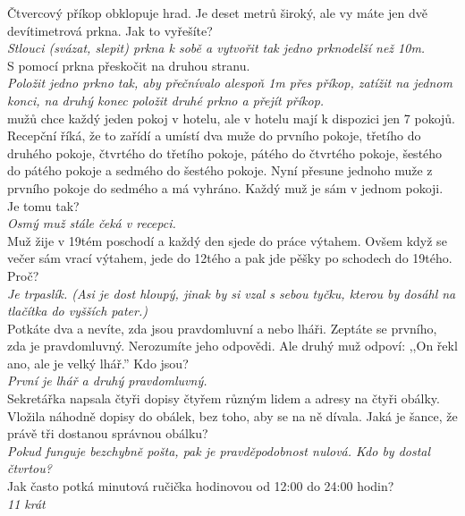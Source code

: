 \begin{multicols}{2}
\noindent
Čtvercový příkop obklopuje hrad. Je deset metrů široký, ale 
vy máte jen dvě devítimetrová prkna. Jak to vyřešíte?\\[1 mm]
{\sl Stlouci (svázat, slepit) prkna k sobě a vytvořit tak jedno
prknodelší než 10m.}\\

\noindent
S pomocí prkna přeskočit na druhou stranu.\\[1 mm]
{\sl Položit jedno prkno tak, aby přečnívalo alespoň 1m přes
příkop, zatížit na jednom konci, na druhý konec položit druhé
prkno a přejít příkop.}\\

 mužů chce každý jeden pokoj v hotelu, ale v hotelu mají 
k dispozici jen 7 pokojů. Recepční říká, že to zařídí a umístí 
dva muže do prvního pokoje, třetího do druhého pokoje, čtvrtého 
do třetího pokoje, pátého do čtvrtého pokoje, šestého do pátého 
pokoje a sedmého do šestého pokoje. Nyní přesune jednoho muže 
z prvního pokoje do sedmého a má vyhráno. Každý muž je sám v 
jednom pokoji. Je tomu tak?\\[1 mm]
{\sl Osmý muž stále čeká v recepci.}\\

\noindent
Muž žije v 19tém poschodí a každý den sjede do práce výtahem. 
Ovšem když se večer sám vrací výtahem, jede do 12tého a pak jde 
pěšky po schodech do 19tého. Proč?\\[1 mm]
{\sl Je trpaslík. (Asi je dost hloupý, jinak by si vzal s sebou 
tyčku, kterou by dosáhl na tlačítka do vyšších pater.)}\\

\noindent
Potkáte dva a nevíte, zda jsou pravdomluvní a nebo lháři. 
Zeptáte se prvního, zda je pravdomluvný. Nerozumíte jeho odpovědi. 
Ale druhý muž odpoví: ,,On řekl ano, ale je velký lhář.'' Kdo 
jsou?\\[1 mm]
{\sl První je lhář a druhý pravdomluvný.}\\

\noindent
Sekretářka napsala čtyři dopisy čtyřem různým lidem a adresy 
na čtyři obálky. Vložila náhodně dopisy do obálek, bez toho, 
aby se na ně dívala. Jaká je šance, že právě tři dostanou správnou
obálku?\\[1 mm]
{\sl Pokud funguje bezchybně pošta, pak je pravděpodobnost nulová.
Kdo by dostal čtvrtou?}\\

\noindent
Jak často potká minutová ručička hodinovou od 12:00 do 24:00 
hodin?\\[1 mm]
{\sl 11 krát}\\


\end{multicols}
